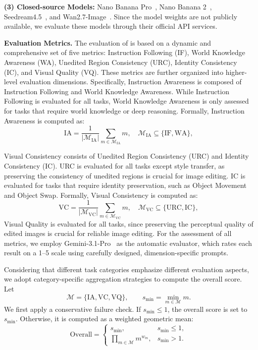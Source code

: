 \hspace*{1em} \noindent\textbf{(3) Closed-source Models:} Nano Banana Pro~\cite{nanobananapro}, Nano Banana 2~\cite{google2026gemini31flashimagepreview},  Seedream4.5~\cite{seedream2025seedream}, and Wan2.7-Image~\cite{wan}. Since the model weights are not publicly available, we evaluate these models through their official API services. 

\textbf{Evaluation Metrics.}
\label{supp: Evaluation pipeline}
The evaluation of {\bench} is based on a dynamic and comprehensive set of five metrics: Instruction Following (IF), World Knowledge Awareness (WA), Unedited Region Consistency (URC), Identity Consistency (IC), and Visual Quality (VQ). These metrics are further organized into higher-level evaluation dimensions. Specifically, Instruction Awareness is composed of Instruction Following and World Knowledge Awareness. While Instruction Following is evaluated for all tasks, World Knowledge Awareness is only assessed for tasks that require world knowledge or deep reasoning. Formally, Instruction Awareness is computed as:
\[
\mathrm{IA} =
\frac{1}{|\mathcal{M}_{\mathrm{IA}}|}
\sum_{m \in \mathcal{M}_{\mathrm{IA}}} m,
\quad
\mathcal{M}_{\mathrm{IA}} \subseteq \{\mathrm{IF}, \mathrm{WA}\},
\]

Visual Consistency consists of Unedited Region Consistency (URC) and Identity Consistency (IC). URC is evaluated for all tasks except style transfer, as preserving the consistency of unedited regions is crucial for image editing. IC is evaluated for tasks that require identity preservation, such as Object Movement and Object Swap. Formally, Visual Consistency is computed as:
\[
\mathrm{VC} =
\frac{1}{|\mathcal{M}_{\mathrm{VC}}|}
\sum_{m \in \mathcal{M}_{\mathrm{VC}}} m,
\quad
\mathcal{M}_{\mathrm{VC}} \subseteq \{\mathrm{URC}, \mathrm{IC}\},
\]
Visual Quality is evaluated for all tasks, since preserving the perceptual quality of edited images is crucial for reliable image editing. For the assessment of all metrics, we employ Gemini-3.1-Pro~\cite{gemini3pro} as the automatic evaluator, which rates each result on a 1--5 scale using carefully designed, dimension-specific prompts.

 
Considering that different task categories emphasize different evaluation aspects, we adopt category-specific aggregation strategies to compute the overall score. Let
\[
\mathcal{M}=\{\mathrm{IA},\mathrm{VC},\mathrm{VQ}\},
\qquad
s_{\min}=\min_{m\in\mathcal{M}} m.
\]
We first apply a conservative failure check. If \(s_{\min}\leq 1\), the overall score is set to \(s_{\min}\). Otherwise, it is computed as a weighted geometric mean:
\[
\mathrm{Overall} =
\begin{cases}
s_{\min}, & s_{\min}\leq 1, \\[3pt]
\prod_{m\in\mathcal{M}} m^{w_m}, & s_{\min}>1.
\end{cases}
\]

